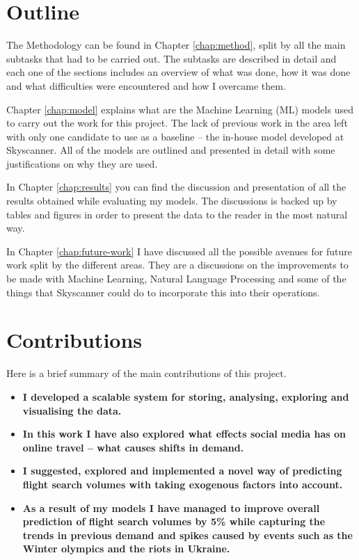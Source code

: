 \documentclass[minf,twoside,singlespacing,parskip,frontabs,notimes,11pt]{infthesis}
\begin{document}
\section{Outline}

The Methodology can be found in Chapter \ref{chap:method}, split by all the main subtasks that had to be carried out. The subtasks are described in detail and each one of the sections includes an overview of what was done, how it was done and what difficulties were encountered and how I overcame them. 


Chapter \ref{chap:model} explains what are the Machine Learning (ML) models used to carry out the work for this project. The lack of previous work in the area left with only one candidate to use as a baseline -- the in-house model developed at Skyscanner. All of the models are outlined and presented in detail with some justifications on why they are used. 


In Chapter \ref{chap:results} you can find the discussion and presentation of all the results obtained while evaluating my models. The discussions is backed up by tables and figures in order to present the data to the reader in the most natural way.


In Chapter \ref{chap:future-work} I have discussed all the possible avenues for future work split by the different areas. They are a discussions on the improvements to be made with Machine Learning, Natural Language Processing and some of the things that Skyscanner could do to incorporate this into their operations. 

\section{Contributions}


Here is a brief summary of the main contributions of this project.

\begin{itemize}
\item \textbf{I developed a scalable system for storing, analysing, exploring and visualising the data.}
\item \textbf{In this work I have also explored what effects social media has on online travel -- what causes shifts in demand.}
\item \textbf{I suggested, explored and implemented a novel way of predicting flight search volumes with taking exogenous factors into account.}
\item \textbf{As a result of my models I have managed to improve overall prediction of flight search volumes by 5\% while capturing the trends in previous demand and spikes caused by events such as the Winter olympics and the riots in Ukraine.} 
\end{itemize}
\end{document}
